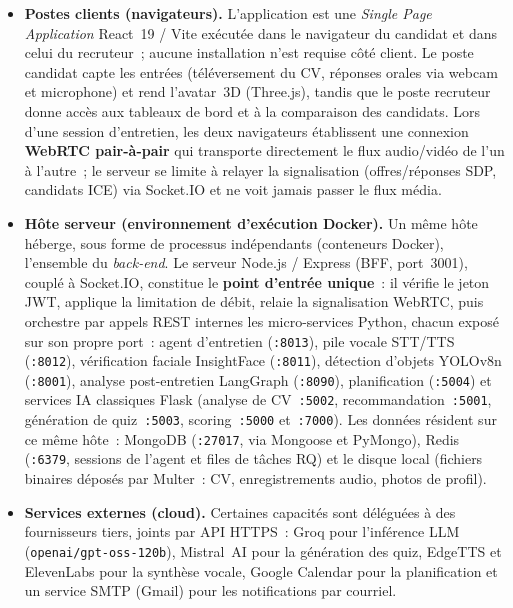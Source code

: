 \begin{itemize}
  \item \textbf{Postes clients (navigateurs).} L'application est une \textit{Single Page Application} React~19 / Vite exécutée dans le navigateur du candidat et dans celui du recruteur~; aucune installation n'est requise côté client. Le poste candidat capte les entrées (téléversement du CV, réponses orales via webcam et microphone) et rend l'avatar~3D (Three.js), tandis que le poste recruteur donne accès aux tableaux de bord et à la comparaison des candidats. Lors d'une session d'entretien, les deux navigateurs établissent une connexion \textbf{WebRTC pair-à-pair} qui transporte directement le flux audio/vidéo de l'un à l'autre~; le serveur se limite à relayer la signalisation (offres/réponses SDP, candidats ICE) via Socket.IO et ne voit jamais passer le flux média.
  \item \textbf{Hôte serveur (environnement d'exécution Docker).} Un même hôte héberge, sous forme de processus indépendants (conteneurs Docker), l'ensemble du \textit{back-end}. Le serveur Node.js / Express (BFF, port~3001), couplé à Socket.IO, constitue le \textbf{point d'entrée unique}~: il vérifie le jeton JWT, applique la limitation de débit, relaie la signalisation WebRTC, puis orchestre par appels REST internes les micro-services Python, chacun exposé sur son propre port~: agent d'entretien (\texttt{:8013}), pile vocale STT/TTS (\texttt{:8012}), vérification faciale InsightFace (\texttt{:8011}), détection d'objets YOLOv8n (\texttt{:8001}), analyse post-entretien LangGraph (\texttt{:8090}), planification (\texttt{:5004}) et services IA classiques Flask (analyse de CV~\texttt{:5002}, recommandation~\texttt{:5001}, génération de quiz~\texttt{:5003}, scoring~\texttt{:5000} et~\texttt{:7000}). Les données résident sur ce même hôte~: MongoDB (\texttt{:27017}, via Mongoose et PyMongo), Redis (\texttt{:6379}, sessions de l'agent et files de tâches RQ) et le disque local (fichiers binaires déposés par Multer~: CV, enregistrements audio, photos de profil).
  \item \textbf{Services externes (cloud).} Certaines capacités sont déléguées à des fournisseurs tiers, joints par API HTTPS~: Groq pour l'inférence LLM (\texttt{openai/\allowbreak gpt-oss-120b}), Mistral~AI pour la génération des quiz, EdgeTTS et ElevenLabs pour la synthèse vocale, Google Calendar pour la planification et un service SMTP (Gmail) pour les notifications par courriel.
\end{itemize}

